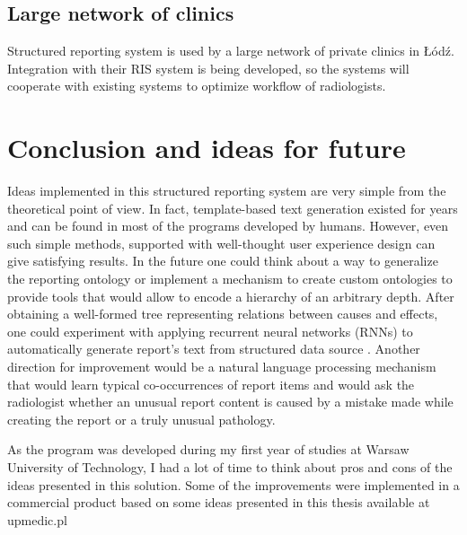 \documentclass[12pt, twoside, openany]{report}
\theoremstyle{definition}
\begin{document}
\section{Large network of clinics}
Structured reporting system is used by a large network of private clinics in Łódź. Integration with their RIS system is being developed, so the systems will cooperate with existing systems to optimize workflow of radiologists.


\chapter{Conclusion and ideas for future}
Ideas implemented in this structured reporting system are very simple from the theoretical point of view. In fact, template-based text generation existed for years and can be found in most of the programs developed by humans. However, even such simple methods, supported with well-thought user experience design can give satisfying results. 
In the future one could think about a way to generalize the reporting ontology or implement a mechanism to create custom ontologies to provide tools that would allow to encode a hierarchy of an arbitrary depth. After obtaining a well-formed tree representing relations between causes and effects, one could experiment with applying recurrent neural networks (RNNs) to automatically generate report's text from structured data source \cite{recurrent-neural-networks}. Another direction for improvement would be a natural language processing mechanism that would learn typical co-occurrences of report items and would ask the radiologist whether an unusual report content is caused by a mistake made while creating the report or a truly unusual pathology. 

As the program was developed during my first year of studies at Warsaw University of Technology, I had a lot of time to think about pros and cons of the ideas presented in this solution. Some of the improvements were implemented in a commercial product based on some ideas presented in this thesis available at upmedic.pl



\end{document}
